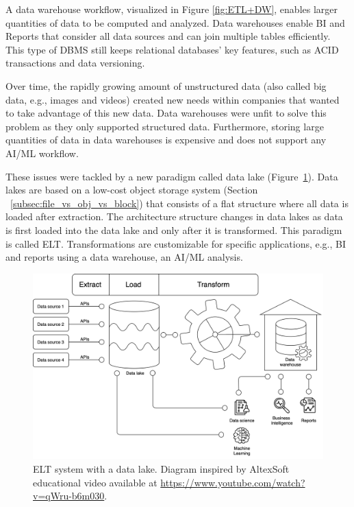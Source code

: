 A data warehouse workflow, visualized in Figure \ref{fig:ETL+DW}, enables larger quantities of data to be computed and analyzed. Data warehouses enable \gls{BI} and Reports that consider all data sources and can join multiple tables efficiently. This type of \gls{DBMS} still keeps relational databases' key features, such as \gls{ACID} transactions and data versioning.

Over time, the rapidly growing amount of unstructured data (also called big data, e.g., images and videos) created new needs within companies that wanted to take advantage of this new data. Data warehouses were unfit to solve this problem as they only supported structured data. Furthermore, storing large quantities of data in data warehouses is expensive and does not support any \gls{AI}/\gls{ML} workflow.

These issues were tackled by a new paradigm called data lake (Figure~\ref{fig:ELT+DL}). Data lakes are based on a low-cost object storage system (Section ~\ref{subsec:file_vs_obj_vs_block}) that consists of a flat structure where all data is loaded after extraction. The architecture structure changes in data lakes as data is first loaded into the data lake and only after it is transformed. This paradigm is called \gls{ELT}. Transformations are customizable for specific applications, e.g., \gls{BI} and reports using a data warehouse, an \gls{AI}/\gls{ML} analysis.

\begin{figure}[!ht]
    \begin{center}
      \includegraphics[width=\textwidth]{figures/2-background/DeltaLake_evolution-ELT+DL.png}
    \end{center}
    \caption[ELT system with a data lake]{\gls{ELT} system with a data lake. Diagram inspired by AltexSoft educational video available at \url{https://www.youtube.com/watch?v=qWru-b6m030}.}
    \label{fig:ELT+DL}
\end{figure}


